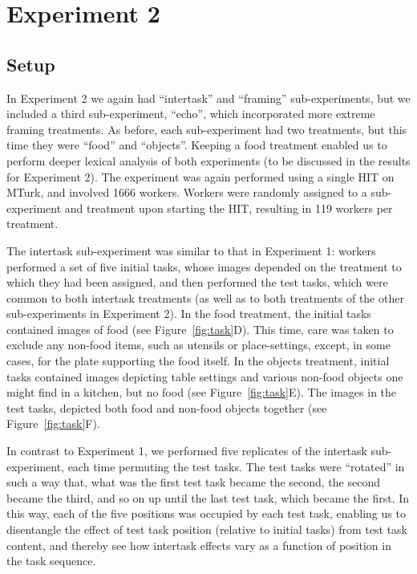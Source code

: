 \documentclass{sigchi}
\begin{document}
\section{Experiment 2}
\subsection{Setup}
In Experiment 2 we again had ``intertask'' and ``framing'' 
sub-experiments, but we included a third sub-experiment, ``echo'', which 
incorporated more extreme framing treatments.  
As before, each sub-experiment had
two treatments, but this time they were ``food'' and ``objects''.
Keeping a food treatment enabled us to perform deeper lexical analysis of 
both experiments (to be discussed in the results for Experiment 2).  
The experiment was again performed using a single HIT on MTurk, 
and involved 1666 workers.
Workers were randomly assigned to a sub-experiment and treatment upon
starting the HIT, resulting in 119 workers per treatment.

The intertask sub-experiment was similar to that in Experiment 1: workers
performed a set of five initial tasks, whose images depended on the 
treatment to which they had been assigned, and then performed the test 
tasks, which were common to both intertask treatments (as well as to both 
treatments of the other sub-experiments in Experiment 2).  
In the food treatment, 
the initial tasks contained images of food (see Figure~\ref{fig:task}D).  
This time, care was taken to exclude any non-food items, 
such as utensils or place-settings, except, in some cases, for the plate
supporting the food itself.  In the objects treatment, initial tasks 
contained images depicting table settings and various non-food objects one 
might find in a kitchen, but no food (see Figure~\ref{fig:task}E).  
The images in the test tasks,
depicted both food and non-food objects together 
(see Figure~\ref{fig:task}F).

In contrast to Experiment 1, we performed five replicates of the intertask
sub-experiment, each time permuting the test tasks.  The test tasks were
``rotated'' in such a way that, what was the first test task became
the second, the second became the third, and so on up until the last test
task, which became the first.  In this way, each of the five positions
was occupied by each test task, enabling us to disentangle the effect of
test task position (relative to initial tasks) from test task content,
and thereby see how intertask effects vary as a function of position in
the task sequence.
\end{document}
